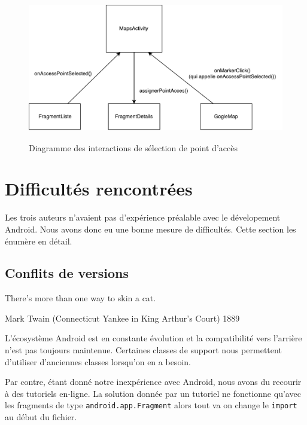 \documentclass[12pt]{article}
\newcommand\code[1]{\texttt{#1}}
\begin{document}
	\begin{figure}[h]
		\centering
		\includegraphics[height=2.5in]{communication_diag.pdf}
		\caption{Diagramme des interactions de sélection de point d'accès}
		\label{fig_interaction}
	\end{figure}



\section{Difficultés rencontrées}

	Les trois auteurs n'avaient pas d'expérience préalable avec le dévelopement
	Android.  Nous avons donc eu une bonne mesure de difficultés.  Cette section
	les énumère en détail.

\subsection{Conflits de versions}

	{\center \og There's more than one way to skin a cat.\fg \\}
		\begin{flushright}
			{\flushright Mark Twain (Connecticut Yankee in King Arthur’s Court)
			1889}
		\end{flushright}

	L'écosystème Android est en constante évolution et la compatibilité vers
	l'arrière n'est pas toujours maintenue.  Certaines classes de support nous
	permettent d'utiliser d'anciennes classes lorsqu'on en a besoin.

	Par contre, étant donné notre inexpérience avec Android, nous avons du
	recourir à des tutoriels en-ligne.  La solution donnée par un tutoriel ne
	fonctionne qu'avec les fragments de type  \code{android.app.Fragment} alors
	tout va on change le \code{import} au début du fichier.
\end{document}
